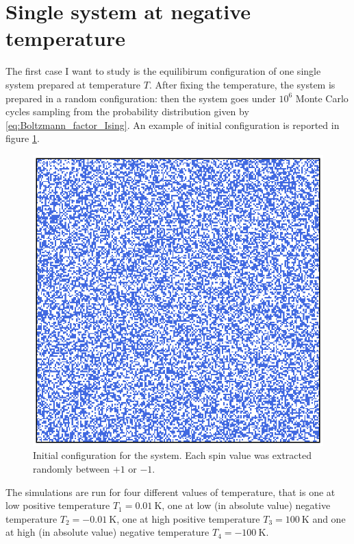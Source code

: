 \section{Single system at negative temperature}
The first case I want to study is the equilibirum configuration of one single system prepared at temperature $T$. After fixing the temperature, the system is prepared in a random configuration: then the system goes under $10^6$ Monte Carlo cycles 
sampling from the probability distribution given by \ref{eq:Boltzmann_factor_Ising}. An example of initial configuration is reported in figure \ref{fig:initial_configuration}. \\
\begin{figure}
    \centering 
    \centering
    \includegraphics[scale=0.5]{./images/ising/initconf.eps}
    \caption{Initial configuration for the system. Each spin value was extracted randomly between $+1$ or $-1$.}
    \label{fig:initial_configuration}
\end{figure}
The simulations are run for four different values of temperature, that is one at low positive temperature $T_1 = \SI{0.01}{\kelvin}$, one at low (in absolute value) negative temperature $T_2 = \SI{-0.01}{\kelvin}$, one at high positive temperature $T_3 = \SI{100}{\kelvin}$ and one at high (in absolute value) negative temperature $T_4 = \SI{-100}{\kelvin}$. 
